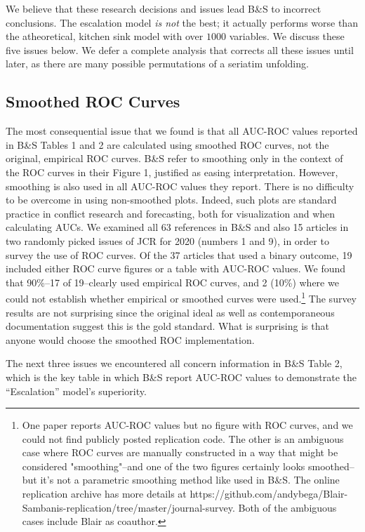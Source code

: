 \documentclass[
]{article}
\begin{document}
We believe that these research decisions and issues lead B\&S to incorrect conclusions. The escalation model \textit{is not} the best; it actually performs worse than the atheoretical, kitchen sink model with over \(1000\) variables. We discuss these five issues below. We defer a complete analysis that corrects all these issues until later, as there are many possible permutations of a seriatim unfolding.

\hypertarget{smoothed-roc-curves}{%
\subsection{Smoothed ROC Curves}\label{smoothed-roc-curves}}

The most consequential issue that we found is that all AUC-ROC values reported in B\&S Tables 1 and 2 are calculated using smoothed ROC curves, not the original, empirical ROC curves. B\&S refer to smoothing only in the context of the ROC curves in their Figure 1, justified as easing interpretation. However, smoothing is also used in all AUC-ROC values they report. There is no difficulty to be overcome in using non-smoothed plots. Indeed, such plots are standard practice in conflict research and forecasting, both for visualization and when calculating AUCs. We examined all 63 references in B\&S and also 15 articles in two randomly picked issues of JCR for 2020 (numbers 1 and 9), in order to survey the use of ROC curves. Of the 37 articles that used a binary outcome, 19 included either ROC curve figures or a table with AUC-ROC values. We found that 90\%--17 of 19--clearly used empirical ROC curves, and 2 (10\%) where we could not establish whether empirical or smoothed curves were used.\footnote{One paper reports AUC-ROC values but no figure with ROC curves, and we could not find publicly posted replication code. The other is an ambiguous case where ROC curves are manually constructed in a way that might be considered "smoothing"--and one of the two figures certainly looks smoothed--but it's not a parametric smoothing method like used in B\&S. The online replication archive has more details at https://github.com/andybega/Blair-Sambanis-replication/tree/master/journal-survey. Both of the ambiguous cases include Blair as coauthor.} The survey results are not surprising since the original ideal as well as contemporaneous documentation suggest this is the gold standard. What is surprising is that anyone would choose the smoothed ROC implementation.

The next three issues we encountered all concern information in B\&S Table 2, which is the key table in which B\&S report AUC-ROC values to demonstrate the ``Escalation'' model's superiority.
\end{document}
